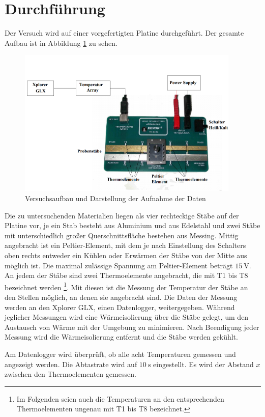 \section{Durchführung}
\label{sec:Durchführung}
Der Versuch wird auf einer vorgefertigten Platine durchgeführt. Der gesamte Aufbau
ist in Abbildung \ref{fig:aufbau} zu sehen.

\begin{figure}
  \centering
  \includegraphics[width=300pt]{data/aufbau.png}
  \caption{Versuchsaufbau und Darstellung der Aufnahme der Daten \cite{Versuchsanleitung}}
  \label{fig:aufbau}
\end{figure}

Die zu untersuchenden Materialien liegen als vier rechteckige Stäbe auf der Platine vor,
je ein Stab besteht aus Aluminium und aus Edelstahl und zwei Stäbe mit unterschiedlich
großer Querschnittsfläche bestehen aus Messing. Mittig angebracht ist ein Peltier-Element,
mit dem je nach Einstellung des Schalters oben rechts entweder ein Kühlen oder
Erwärmen der Stäbe von der Mitte aus möglich ist. Die maximal zulässige Spannung am Peltier-Element beträgt $\SI{15}{\volt}$.
An jedem der Stäbe sind zwei Thermoelemente angebracht, die mit T1 bis T8 bezeichnet werden
\footnote{Im Folgenden seien auch die Temperaturen an den entsprechenden Thermoelementen ungenau mit T1 bis T8 bezeichnet.}.
Mit diesen ist die Messung der Temperatur der Stäbe an den Stellen möglich,
an denen sie angebracht sind. Die Daten der Messung werden an den Xplorer GLX, einen Datenlogger, weitergegeben.
Während jeglicher Messungen wird eine Wärmeisolierung über die Stäbe gelegt, um
den Austausch von Wärme mit der Umgebung zu minimieren. Nach Beendigung jeder Messung
wird die Wärmeisolierung entfernt und die Stäbe werden gekühlt.

Am Datenlogger wird überprüft, ob alle acht Temperaturen gemessen und angezeigt werden.
Die Abtastrate wird auf $\SI{10}{\second}$ eingestellt.
Es wird der Abstand $x$ zwischen den Thermoelementen gemessen.

